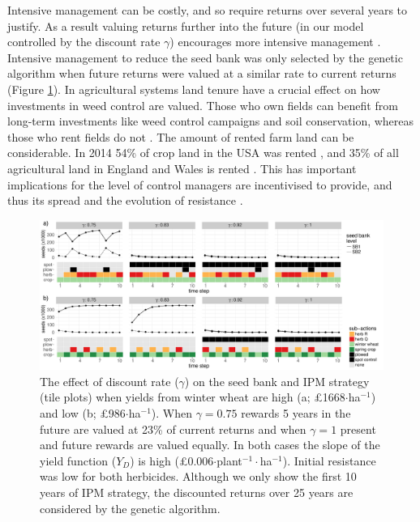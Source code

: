 \documentclass[9pt,twocolumn,twoside,lineno]{pnas-new}
\begin{document}
Intensive management can be costly, and so require returns over several years to justify. As a result valuing returns further into the future (in our model controlled by the discount rate $\gamma$) encourages more intensive management \citep{EpanN2010}. Intensive management to reduce the seed bank was only selected by the genetic algorithm when future returns were valued at a similar rate to current returns (Figure \ref{fig:dis_rate}). In agricultural systems land tenure have a crucial effect on how investments in weed control are valued. Those who own fields can benefit from long-term investments like weed control campaigns and soil conservation, whereas those who rent fields do not \citep{Wies1996, Fras2004}. The amount of rented farm land can be considerable. In 2014  54\% of crop land in the USA was rented \citep{Bige2016}, and 35\% of all agricultural land in England and Wales is rented \citep{CAAV2017}. This has important implications for the level of control managers are incentivised to provide, and thus its spread and the evolution of resistance \citep{Mare2012}.       
\begin{figure}
	\includegraphics[width=178mm]{dis_rate_SB_strat.pdf}
	\caption{The effect of discount rate ($\gamma$) on the seed bank and IPM strategy (tile plots) when yields from winter wheat are high (a; \pounds 1668$\cdot$ha$^{-1}$) and low (b; \pounds 986$\cdot$ha$^{-1}$). When $\gamma = 0.75$ rewards 5 years in the future are valued at 23\% of current returns and when $\gamma = 1$ present and future rewards are valued equally. In both cases the slope of the yield function ($Y_D$) is high (\pounds 0.006$\cdot$plant$^{-1}\cdot$ha$^{-1}$). Initial resistance was low for both herbicides. Although we only show the first 10 years of IPM strategy, the discounted returns over 25 years are considered by the genetic algorithm.}
	\label{fig:dis_rate} 
\end{figure}
\end{document}
